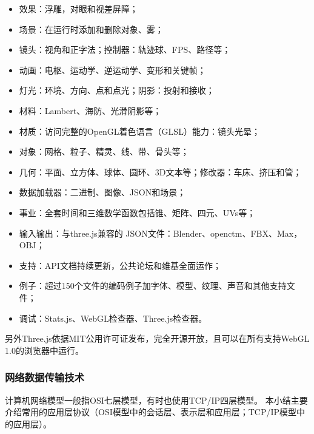 \begin{itemize}
    \begin{itemize}
        \item 效果：浮雕，对眼和视差屏障；
        \item 场景：在运行时添加和删除对象、雾；
        \item 镜头：视角和正字法；控制器：轨迹球、FPS、路径等；
        \item 动画：电枢、运动学、逆运动学、变形和关键帧；
        \item 灯光：环境、方向、点和点光；阴影：投射和接收；
        \item 材料：Lambert、海防、光滑阴影等；
        \item 材质：访问完整的OpenGL着色语言（GLSL）能力：镜头光晕；
        \item 对象：网格、粒子、精灵、线、带、骨头等；
        \item 几何：平面、立方体、球体、圆环、3D文本等；修改器：车床、挤压和管；
        \item 数据加载器：二进制、图像、JSON和场景；
        \item 事业：全套时间和三维数学函数包括锥、矩阵、四元、UVs等；
        \item 输入输出：与three.js兼容的 JSON文件：Blender、openctm、FBX、Max，OBJ；
        \item 支持：API文档持续更新，公共论坛和维基全面运作；
        \item 例子：超过150个文件的编码例子加字体、模型、纹理、声音和其他支持文件；
        \item 调试：Stats.js、WebGL检查器、Three.js检查器。
    \end{itemize}

    另外Three.js依据MIT公用许可证发布，完全开源开放，且可以在所有支持WebGL 1.0的浏览器中运行。

\end{itemize}

\subsubsection{网络数据传输技术}

计算机网络模型一般指OSI七层模型，有时也使用TCP/IP四层模型。
本小结主要介绍常用的应用层协议（OSI模型中的会话层、表示层和应用层；TCP/IP模型中的应用层）。

